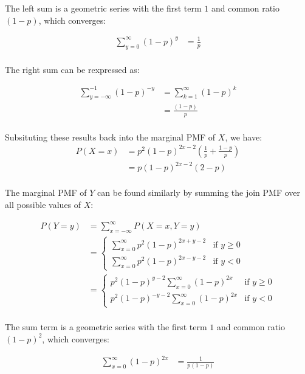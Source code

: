 \documentclass[12pt]{article}
\begin{document}
\begin{enumerate}
\begin{enumerate}
The left sum is a geometric series with the first term $1$ and common ratio $(1-p)$, which converges:

\begin{align*}
\sum_{y=0}^{\infty} (1-p)^{y} &= \frac{1}{p} \\
\end{align*}

The right sum can be rexpressed as:

\begin{align*}
\sum_{y=-\infty}^{-1} (1-p)^{-y} &= \sum_{k=1}^{\infty} (1-p)^{k} \\
&= \frac{(1-p)}{p} \\
\end{align*}

Subsituting these results back into the marginal PMF of $X$, we have:
\begin{align*}
P(X=x) &= p^2(1-p)^{2x-2} \left(\frac{1}{p} + \frac{1-p}{p}\right) \\
&= p(1-p)^{2x-2} \left( 2-p \right) \\
\end{align*}

The marginal PMF of $Y$ can be found similarly by summing the join PMF over all possible values of $X$:

\begin{align*}
P(Y=y) &= \sum_{x=-\infty}^{\infty} P(X=x, Y=y) \\
&= \begin{cases}
\sum_{x=0}^{\infty} p^2(1-p)^{2x+y-2} & \text{if } y \geq 0 \\
\sum_{x=0}^{\infty} p^2(1-p)^{2x-y-2} & \text{if } y < 0
\end{cases}	\\
&= \begin{cases}
	p^2(1-p)^{y-2} \sum_{x=0}^{\infty} (1-p)^{2x} & \text{if } y \geq 0 \\
	p^2(1-p)^{-y-2} \sum_{x=0}^{\infty} (1-p)^{2x} & \text{if } y < 0
\end{cases} \\
\end{align*}

The sum term is a geometric series with the first term $1$ and common ratio $(1-p)^2$, which converges:

\begin{align*}
\sum_{x=0}^{\infty} (1-p)^{2x} &= \frac{1}{p(1-p)} \\
\end{align*}


\end{enumerate}
\end{enumerate}
\end{document}
